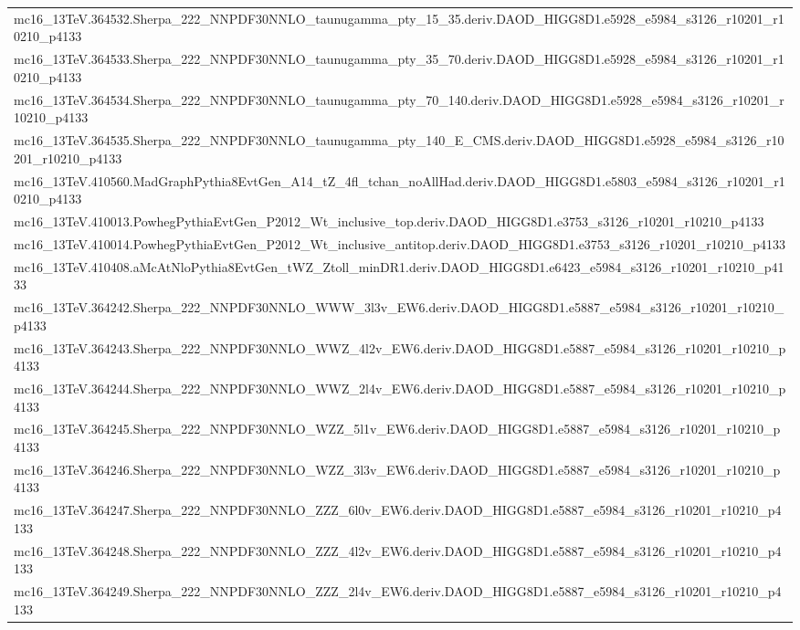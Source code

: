 \begin{adjustwidth}{-3em}{-3em}
\begin{longtable}{l}
mc16\_13TeV.364532.Sherpa\_222\_NNPDF30NNLO\_taunugamma\_pty\_15\_35.deriv.DAOD\_HIGG8D1.e5928\_e5984\_s3126\_r10201\_r10210\_p4133 \\
mc16\_13TeV.364533.Sherpa\_222\_NNPDF30NNLO\_taunugamma\_pty\_35\_70.deriv.DAOD\_HIGG8D1.e5928\_e5984\_s3126\_r10201\_r10210\_p4133 \\
mc16\_13TeV.364534.Sherpa\_222\_NNPDF30NNLO\_taunugamma\_pty\_70\_140.deriv.DAOD\_HIGG8D1.e5928\_e5984\_s3126\_r10201\_r10210\_p4133 \\
mc16\_13TeV.364535.Sherpa\_222\_NNPDF30NNLO\_taunugamma\_pty\_140\_E\_CMS.deriv.DAOD\_HIGG8D1.e5928\_e5984\_s3126\_r10201\_r10210\_p4133 \\
mc16\_13TeV.410560.MadGraphPythia8EvtGen\_A14\_tZ\_4fl\_tchan\_noAllHad.deriv.DAOD\_HIGG8D1.e5803\_e5984\_s3126\_r10201\_r10210\_p4133 \\
mc16\_13TeV.410013.PowhegPythiaEvtGen\_P2012\_Wt\_inclusive\_top.deriv.DAOD\_HIGG8D1.e3753\_s3126\_r10201\_r10210\_p4133 \\
mc16\_13TeV.410014.PowhegPythiaEvtGen\_P2012\_Wt\_inclusive\_antitop.deriv.DAOD\_HIGG8D1.e3753\_s3126\_r10201\_r10210\_p4133 \\
mc16\_13TeV.410408.aMcAtNloPythia8EvtGen\_tWZ\_Ztoll\_minDR1.deriv.DAOD\_HIGG8D1.e6423\_e5984\_s3126\_r10201\_r10210\_p4133 \\
mc16\_13TeV.364242.Sherpa\_222\_NNPDF30NNLO\_WWW\_3l3v\_EW6.deriv.DAOD\_HIGG8D1.e5887\_e5984\_s3126\_r10201\_r10210\_p4133 \\
mc16\_13TeV.364243.Sherpa\_222\_NNPDF30NNLO\_WWZ\_4l2v\_EW6.deriv.DAOD\_HIGG8D1.e5887\_e5984\_s3126\_r10201\_r10210\_p4133 \\
mc16\_13TeV.364244.Sherpa\_222\_NNPDF30NNLO\_WWZ\_2l4v\_EW6.deriv.DAOD\_HIGG8D1.e5887\_e5984\_s3126\_r10201\_r10210\_p4133 \\
mc16\_13TeV.364245.Sherpa\_222\_NNPDF30NNLO\_WZZ\_5l1v\_EW6.deriv.DAOD\_HIGG8D1.e5887\_e5984\_s3126\_r10201\_r10210\_p4133 \\
mc16\_13TeV.364246.Sherpa\_222\_NNPDF30NNLO\_WZZ\_3l3v\_EW6.deriv.DAOD\_HIGG8D1.e5887\_e5984\_s3126\_r10201\_r10210\_p4133 \\
mc16\_13TeV.364247.Sherpa\_222\_NNPDF30NNLO\_ZZZ\_6l0v\_EW6.deriv.DAOD\_HIGG8D1.e5887\_e5984\_s3126\_r10201\_r10210\_p4133 \\
mc16\_13TeV.364248.Sherpa\_222\_NNPDF30NNLO\_ZZZ\_4l2v\_EW6.deriv.DAOD\_HIGG8D1.e5887\_e5984\_s3126\_r10201\_r10210\_p4133 \\
mc16\_13TeV.364249.Sherpa\_222\_NNPDF30NNLO\_ZZZ\_2l4v\_EW6.deriv.DAOD\_HIGG8D1.e5887\_e5984\_s3126\_r10201\_r10210\_p4133 \\

\end{longtable}
\end{adjustwidth}
